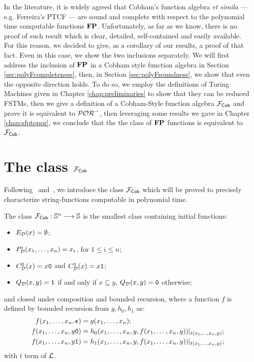 In the literature, it is widely agreed  that Cobham's function algebra \emph{et simila}
--- e.g. Ferreira's PTCF --- are sound and complete with respect to the polynomial
time computable functions $\mathbf{FP}$. Unfortunately,
as far as we know, there is no proof of such result which is clear,
detailed, self-contained and easily available.
%
For this reason, we decided to give, as a corollary of our results,
a proof of that fact.
%
Even in this case, we show the two inclusions separately. We will first address
the inclusion of $\mathbf{FP}$ in a Cobham style function algebra in Section \ref{sec:polyFcompleteness},
then, in Section \ref{sec:polyFsoundness}, we show that even the opposite direction holds.
%
To do so, we employ the definitions of Turing Machines given in Chapter \ref{chap:preliminaries}
to show that they can be reduced FSTMs,
then we give a definition of a Cobham-Style function algebra $\mathcal{F}_{\mathsf{Cob}}$ and prove it
is equivalent to $\mathcal{POR}^-$, then leveraging
some results we gave in Chapter \ref{chap:sfptopor}, we conclude that the
the class of $\mathbf{FP}$ functions is equivalent to $\mathcal{F}_{\mathsf{Cob}}$.



\section{The class $\mathcal{F}_{\mathsf{Cob}}$}

Following~\cite{Ferreira88} and~\cite{Cobham1965}, we introduce the class $\mathcal{F}_{\mathsf{Cob}}$ which will be proved to precisely characterize string-functions computable in polynomial time.

\begin{defn}
The class $\mathcal{F}_{\mathsf{Cob}}: \mathbb{S}^n \longrightarrow \mathbb{S}$ is
the smallest class containing initial functions:
\begin{itemize}
\itemsep0em

\item ${E}_{\mathcal{D}}(x)=\emptyset$;

\item ${P}_{\mathcal{D}}^i(x_1,\dots, x_n)=x_i$, for $1\leq i\leq n$;

\item ${C}_{\mathcal{D}}^{\mathtt{0}}(x) = x\mathtt{0}$ and
${C}_{\mathcal{D}}^{\mathtt{1}}(x) = x\mathtt{1}$;

\item ${Q}_{\mathcal{D}}(x,y)=\mathtt{1}$ if and only if $x\subseteq y$,
${Q}_{\mathcal{D}}(x,y)=\mathtt{0}$ otherwise;

\end{itemize}
and closed under composition and
bounded recursion,
where a function $f$ is defined by bounded
recursion from $g, h_0, h_1$ as:
\begin{align*}
f(x_1,\dots, x_n,\eepsilon) &= g(x_1,\dots, x_n); \\
%
f(x_1,\dots, x_n, y\zero) &= h_0(x_1,\dots, x_n, y,
f(x_1,\dots, x_n, y)) |_{t(x_1,\dots, x_n,y)}; \\
%
f(x_1,\dots, x_n,y\one) &= h_1(x_1,\dots, x_n,
y, f(x_1,\dots, x_n,y))|_{t(x_1,\dots, x_n,y)};
\end{align*}
with $t$ term of $\mathcal{L}$.
\end{defn}


